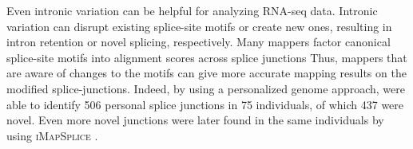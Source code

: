Even intronic variation can be helpful for analyzing RNA-seq data. 
Intronic variation can disrupt existing splice-site motifs or create new ones, resulting in intron retention or novel splicing, respectively. 
Many mappers factor canonical splice-site motifs into alignment scores across splice junctions
Thus, mappers that are aware of changes to the motifs can give more accurate mapping results on the modified splice-junctions. 
Indeed, by using a personalized genome approach, \citeauthor{Stein_2015} \cite{Stein_2015} were able to identify 506 personal splice junctions in 75 individuals, of which 437 were novel.
Even more novel junctions were later found in the same individuals by \citeauthor{Liu_2018} using \textsc{iMapSplice} \cite{Liu_2018}.


%


